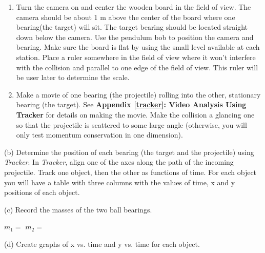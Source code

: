 \begin{enumerate}
\item Turn the camera on and center the wooden board in the field of view. The camera
should be about 1 m above the center of the board where one bearing(the target)
will sit. The target bearing should be located straight down below the camera.
Use the pendulum bob to position the camera and bearing. Make sure the board
is flat by using the small level available at each station. Place a ruler somewhere
in the field of view where it won't interfere with the collision and parallel
to one edge of the field of view. This ruler will be user later to determine
the scale. 
\item Make a movie of one bearing (the projectile) rolling into the other, stationary
bearing (the target). See \textbf{Appendix \ref{tracker}: Video Analysis Using Tracker} 
for details on making the movie. Make the collision a glancing one so that the 
projectile is scattered to some large angle (otherwise, you will only test 
momentum conservation in one dimension).
\end{enumerate}
(b) Determine the position of each bearing (the target and the projectile) 
using \textit{Tracker}. In \textit{Tracker}, align one of the axes along the 
path of the incoming projectile. Track one object, then the other as functions 
of time. For each object you will have a table with three columns with the 
values of time, x and y positions of each object.
\vspace{5mm}


(c) Record the masses of the two ball bearings.
\vspace{5mm}

\( m_{1} =\)  \hfill{}\( m_{2} =\)  \hfill{}
\vspace{5mm}

(d) Create graphs of x vs. time and y vs. time for each object.
\vspace{7mm}

